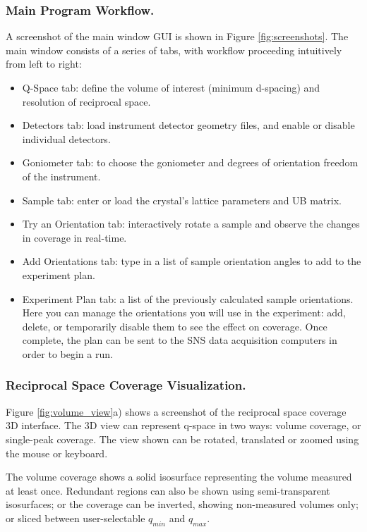 \documentclass[final]{iucr}              %
\begin{document}
\subsubsection{Main Program Workflow.}
A screenshot of the main window GUI is shown in Figure \ref{fig:screenshots}.
The main window consists of a series of tabs, with workflow proceeding
intuitively from left to right:

\begin{itemize}
  	\item Q-Space tab: define the volume of interest (minimum d-spacing) and
resolution of reciprocal space. 
 	\item Detectors tab: load instrument detector geometry
files, and enable or disable individual detectors. 
	\item Goniometer tab: to choose the
goniometer and degrees of orientation freedom of the instrument.
  	\item Sample tab: enter or load the crystal's lattice parameters and UB
  matrix.
  	\item Try an Orientation tab: interactively rotate a sample and observe the
  changes in coverage in real-time.
  	\item Add Orientations tab: type in a list of sample orientation angles to
  add to the experiment plan.
 
  	\item Experiment Plan tab: a list of the previously calculated sample
orientations. Here you can manage the orientations you will use in the experiment: add,
delete, or temporarily disable them to see the effect on coverage. Once
complete, the plan can be sent to the SNS data acquisition computers in order to
begin a run.
    
\end{itemize} 



\subsubsection{Reciprocal Space Coverage Visualization.}
Figure \ref{fig:volume_view}a) shows a screenshot of the reciprocal space
coverage 3D interface. The 3D view can represent q-space in two ways: volume coverage, or single-peak
coverage. The view shown can be rotated, translated or zoomed using the mouse or
keyboard.

The volume coverage shows a solid isosurface representing the volume measured at
least once. Redundant regions can also be shown using semi-transparent
isosurfaces; or the coverage can be inverted, showing non-measured volumes only;
or sliced between user-selectable $q_{min}$ and $q_{max}$.        
\end{document}
